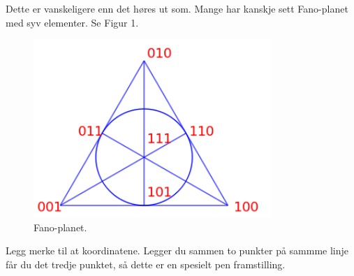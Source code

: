 \documentclass[11pt, norsk]{article}
\begin{document}
\begin{losn} 
Dette er vanskeligere enn det høres ut som. Mange har kanskje sett Fano-planet med syv elementer. Se Figur 1.
\begin{figure}
 \centering
\includegraphics[width=90mm]{fanoplane}
  \caption{Fano-planet.}
\end{figure}  
Legg merke til at koordinatene. Legger du sammen to punkter på sammme linje får du det tredje punktet, så dette er en spesielt pen framstilling.


\end{losn}
\end{document}
